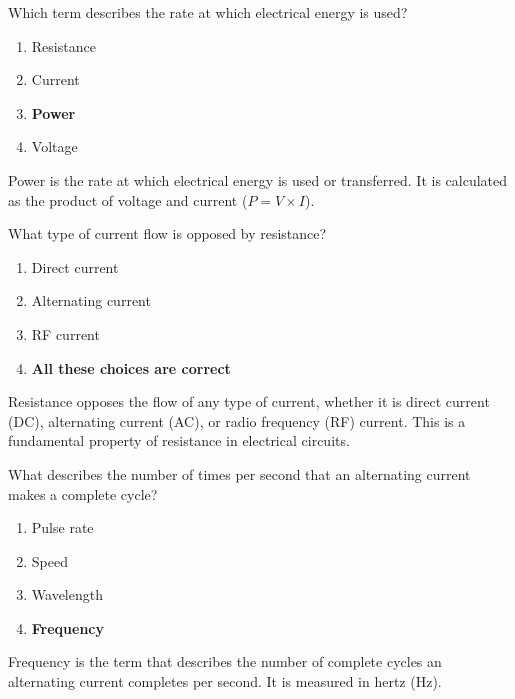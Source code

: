 \begin{tcolorbox}[colback=gray!10!white,colframe=black!75!black,title={T5A10}]
    Which term describes the rate at which electrical energy is used?
    \begin{enumerate}[label=\Alph*,noitemsep]
        \item Resistance
        \item Current
        \item \textbf{Power}
        \item Voltage
    \end{enumerate}
\end{tcolorbox}
Power is the rate at which electrical energy is used or transferred. It is calculated as the product of voltage and current (\( P = V \times I \)).


\begin{tcolorbox}[colback=gray!10!white,colframe=black!75!black,title={T5A11}]
    What type of current flow is opposed by resistance?
    \begin{enumerate}[label=\Alph*,noitemsep]
        \item Direct current
        \item Alternating current
        \item RF current
        \item \textbf{All these choices are correct}
    \end{enumerate}
\end{tcolorbox}
Resistance opposes the flow of any type of current, whether it is direct current (DC), alternating current (AC), or radio frequency (RF) current. This is a fundamental property of resistance in electrical circuits.


\begin{tcolorbox}[colback=gray!10!white,colframe=black!75!black,title={T5A12}]
    What describes the number of times per second that an alternating current makes a complete cycle?
    \begin{enumerate}[label=\Alph*,noitemsep]
        \item Pulse rate
        \item Speed
        \item Wavelength
        \item \textbf{Frequency}
    \end{enumerate}
\end{tcolorbox}
Frequency is the term that describes the number of complete cycles an alternating current completes per second. It is measured in hertz (Hz).

